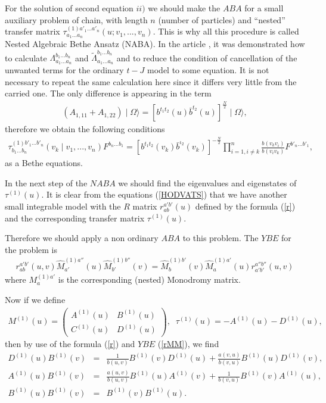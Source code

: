 \documentclass[a4paper,12pt]{article}
\newcommand{\nn}{\nonumber}
\begin{document}
For the solution of second equation $ii)$ we should make the $ABA$ for a 
small auxiliary problem of chain, with length $n$ (number of particles) 
and ``nested'' transfer matrix $\tau_{a_{1}...a_{n}}^{(1)a'_{1}...a'_{n}}
(u;v_{1},...,v_{n}).$ This is why all this procedure is called Nested 
Algebraic Bethe Ansatz (NABA). In the article \cite{EK}, it was demonstrated
how to calculate $\Lambda_{a_{1}...a_{n}}^{b_{1}...b_{n}}$ and
$\tilde \Lambda_{a_{1}...a_{n}}^{b_{1}...b_{n}}$ and to reduce the condition 
of cancellation of the  unwanted terms for the ordinary $t-J$ model 
to some equation. It is not necessary to repeat the same calculation 
here since it differs very little from the carried one. The only 
difference is appearing in the term 
\begin{eqnarray}
\label{AA}
(A_{1,11}+A_{1,22})\mid \Omega\rangle=[b^{t_{1}t_{2}}(u)\bar{b}^{t_{2}}(u)]
^{\frac{N}{2}}\mid \Omega\rangle,
\end{eqnarray}
therefore we obtain the following conditions
\begin{eqnarray}
\label{TF}
\tau_{b_{1}...b_{n}}^{(1)b'_{1}...b'_{n}}(v_{k}\mid v_{1},...,v_{n})
F^{b_{n}...b_{1}}=[b^{t_{1}t_{2}}(v_{k})\bar{b}^{\iota_2}(v_{k})]^{-\frac{N}{2}}
\prod_{i=1,i\neq{k}}^{n}\frac{b(v_{k}v_{i})}{b(v_{i}v_{k})}
F^{b'_{n}...b'_{1}},
\end{eqnarray}
as a Bethe equations.

In the next step of the $NABA$ we should find the  eigenvalues and 
eigenstates of $\tau^{(1)}(u)$. It is clear from the equations 
(\ref{HODVATS}) that we have another small integrable model with the 
$R$ matrix $r_{ab}^{a'b'}(u)$ defined by the formula (\ref{r}) and 
the corresponding transfer matrix $\tau^{(1)}(u).$

Therefore we should apply a non ordinary $ABA$ to this problem.
The $YBE$ for the problem is  
\begin{eqnarray}
\label{rMM}
r_{ab}^{a'b'}(u,v)\hat{M}_{a'}^{(1)a''}(u)\hat{M}_{b'}^{(1)b''}(v)=
\hat{M}_{b}^{(1)b'}(v)\hat{M}_{a}^{(1)a'}(u)r_{a'b'}^{a''b''}(u,v)
\end{eqnarray}
where $M_{a}^{(1)a'}$ is the corresponding (nested) Monodromy
matrix.

Now if we define
\begin{eqnarray}
\label{M7}
M^{(1)}(u)=\left(
\begin{array}{ll}
A^{(1)}(u)&B^{(1)}(u)\\
C^{(1)}(u)&D^{(1)}(u)
\end{array}
\right),\;\;\tau^{(1)}(u)=-A^{(1)}(u)-D^{(1)}(u),
\end{eqnarray}
then by use of the formula (\ref{r}) and $YBE$ (\ref{rMM}), we find
\begin{eqnarray}
\label{DBA1}
D^{(1)}(u)B^{(1)} (v)&=&\frac{1}{b(u,v)}B^{(1)} (v)D^{(1)}(u)+
\frac{a(v,u)}{b(v,u)}B^{(1)} (u)D^{(1)}(v),\nn\\
A^{(1)}(u) B^{(1)}(v)&=&\frac{a(u,v)}{b(u,v)}B^{(1)}(u) A^{(1)}(v)+
\frac{1}{b(v,u)}B^{(1)}(v) A^{(1)}(u),\nn\\
B^{(1)}(u) B^{(1)}(v)&=&B^{(1)}(v) B^{(1)}(u).
\end{eqnarray}
\end{document}
